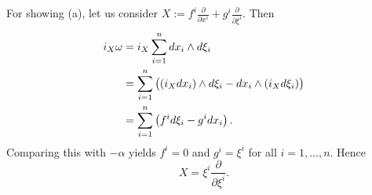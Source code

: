 \begin{solution}
	For showing (a), let us consider $X := f^i \frac{\partial}{\partial x^i} + g^i \frac{\partial}{\partial \xi^i}$. Then
	\begin{align*}
		i_X\omega &= i_X\sum_{i = 1}^n dx_i \wedge d\xi_i\\
		&= \sum_{i = 1}^n \del[1]{(i_Xdx_i) \wedge d\xi_i - dx_i \wedge (i_X d\xi_i)}\\
		&= \sum_{i = 1}^n \del[1]{f^i d\xi_i - g^i dx_i}. 
	\end{align*}
	Comparing this with $-\alpha$ yields $f^i = 0$ and $g^i = \xi^i$ for all $i = 1,\dots,n$. Hence
	\begin{equation*}
		X = \xi^i \frac{\partial}{\partial \xi^i}.
	\end{equation*}
\end{solution}



